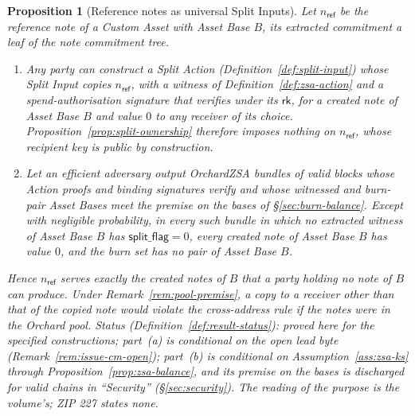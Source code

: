\documentclass[11pt,a4paper]{article}
\newtheorem{proposition}[theorem]{Proposition}
\theoremstyle{definition}
\newcommand{\rk}{\mathsf{rk}}
\begin{document}
\begin{proposition}[Reference notes as universal Split Inputs]
\label{prop:reference-copy}
Let $n_{\mathsf{ref}}$ be the reference note of a Custom Asset with Asset
Base $B$, its extracted commitment a leaf of the note commitment tree.
\begin{enumerate}
\item[(a)] Any party can construct a Split Action
  (Definition~\ref{def:split-input}) whose Split Input copies
  $n_{\mathsf{ref}}$, with a witness of Definition~\ref{def:zsa-action}
  and a spend-authorisation signature that verifies under its $\rk$, for a
  created note of Asset Base $B$ and value $0$ to any receiver of its
  choice. Proposition~\ref{prop:split-ownership} therefore imposes nothing
  on $n_{\mathsf{ref}}$, whose recipient key is public by construction.
\item[(b)] Let an efficient adversary output OrchardZSA bundles of valid
  blocks whose Action proofs and binding signatures verify and whose witnessed
  and burn-pair Asset Bases meet the premise on the bases of
  \S\ref{sec:burn-balance}. Except with negligible probability, in every
  such bundle in which no extracted witness of Asset Base $B$ has
  $\mathsf{split\_flag} = 0$, every created note of Asset Base $B$ has
  value $0$, and the burn set has no pair of Asset Base $B$.
\end{enumerate}
Hence $n_{\mathsf{ref}}$ serves exactly the created notes of $B$ that a
party holding no note of $B$ can produce. Under
Remark~\ref{rem:pool-premise}, a copy to a receiver other than that of the
copied note would violate the cross-address rule if the notes were in the
Orchard pool. Status (Definition~\ref{def:result-status}): proved here for
the specified constructions; part~(a) is conditional on the open lead byte
(Remark~\ref{rem:issue-cm-open}); part~(b) is conditional on
Assumption~\ref{ass:zsa-ks} through Proposition~\ref{prop:zsa-balance}, and
its premise on the bases is discharged for valid chains in ``Security''
(\S\ref{sec:security}). The reading of the purpose is the volume's; ZIP 227
states none.
\end{proposition}
\end{document}
